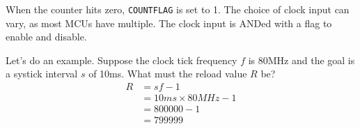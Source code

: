 When the counter hits zero, \texttt{COUNTFLAG} is set to 1.
The choice of clock input can vary, as most MCUs have multiple.
The clock input is ANDed with a flag to enable and disable.

Let's do an example. Suppose the clock tick frequency $f$ is
80MHz and the goal is a systick
interval $s$ of 10ms. What must the reload value $R$ be?
\begin{align}
    R & = sf - 1                \\
      & = 10ms \times 80MHz - 1 \\
      & = 800000 - 1            \\
      & = 799999
\end{align}

